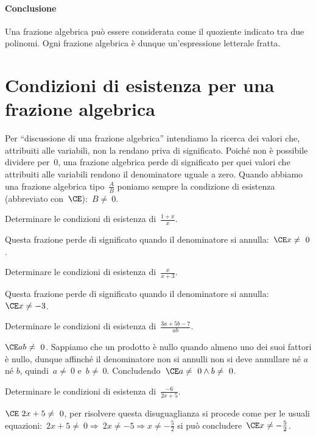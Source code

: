 \paragraph{Conclusione}Una frazione algebrica può essere considerata come il 
quoziente indicato tra due polinomi.
Ogni frazione algebrica è dunque un'espressione letterale fratta.

\section{Condizioni di esistenza per una frazione algebrica}
\label{sec:frazalg_condizioniesistenza}

Per ``discussione di una frazione algebrica'' intendiamo la ricerca dei valori 
che, attribuiti alle variabili, non la rendano priva di significato. 
Poiché non è possibile dividere per~$0$, una frazione algebrica perde di 
significato per quei valori che attribuiti alle variabili rendono il 
denominatore uguale a zero. 
Quando abbiamo una frazione algebrica tipo~$\frac{A}{B}$ poniamo sempre la 
condizione di esistenza (abbreviato con~$\CE$):~$B\neq~0$.

 \begin{esempio}
Determinare le condizioni di esistenza di~$\frac{1+x}{x}$.

Questa frazione perde di significato quando il denominatore si 
annulla:~$\CE x\neq~0$.
 \end{esempio}

 \begin{esempio}
Determinare le condizioni di esistenza di~$\frac{x}{x+3}$.

Questa frazione perde di significato quando il denominatore si 
annulla:~$\CE x\neq -3$.
 \end{esempio}

 \begin{esempio}
Determinare le condizioni di esistenza di~$\frac{3a+5b-7}{ab}$.

$\CE ab\neq~0$. Sappiamo che un prodotto è nullo quando almeno uno dei suoi 
fattori è nullo, dunque affinché il denominatore non si annulli non si deve 
annullare né $a$ né $b$,
quindi~$a\neq~0$ e~$b\neq~0$. Concludendo~$\CE a\neq~0\wedge b\neq~0$.
 \end{esempio}

 \begin{esempio}
Determinare le condizioni di esistenza di~$\frac{-6}{2x+5}$.

$\CE~2x+5\neq~0$, per risolvere questa disuguaglianza si procede come per le 
usuali 
equazioni:~$2x+5\neq~0 \Rightarrow~2x\neq -5\Rightarrow x\neq -{\frac{5}{2}}$ 
si può concludere~$\CE x\neq -{\frac{5}{2}}$.
 \end{esempio}

